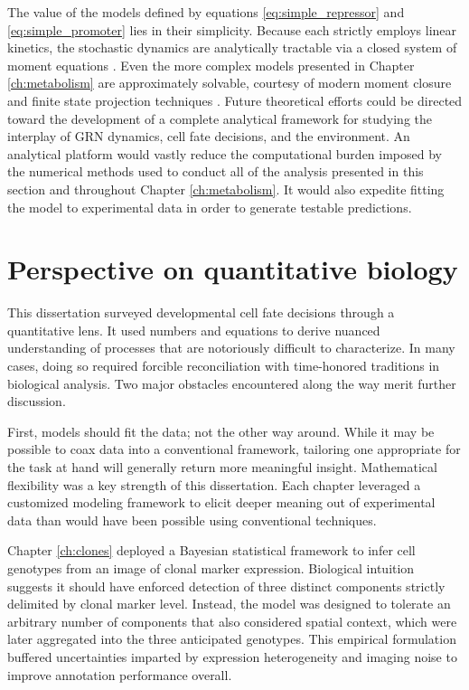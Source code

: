 The value of the models defined by equations \ref{eq:simple_repressor} and \ref{eq:simple_promoter} lies in their simplicity. Because each strictly employs linear kinetics, the stochastic dynamics are analytically tractable via a closed system of moment equations \cite{Sotiropoulos2011}. Even the more complex models presented in Chapter \ref{ch:metabolism} are approximately solvable, courtesy of modern moment closure and finite state projection techniques \cite{Singh2011,Munsky2006}. Future theoretical efforts could be directed toward the development of a complete analytical framework for studying the interplay of GRN dynamics, cell fate decisions, and the environment. An analytical platform would vastly reduce the computational burden imposed by the numerical methods used to conduct all of the analysis presented in this section and throughout Chapter \ref{ch:metabolism}. It would also expedite fitting the model to experimental data in order to generate testable predictions. 

\section{Perspective on quantitative biology}

This dissertation surveyed developmental cell fate decisions through a quantitative lens. It used numbers and equations to derive nuanced understanding of processes that are notoriously difficult to characterize. In many cases, doing so required forcible reconciliation with time-honored traditions in biological analysis. Two major obstacles encountered along the way merit further discussion.

First, models should fit the data; not the other way around. While it may be possible to coax data into a conventional framework, tailoring one appropriate for the task at hand will generally return more meaningful insight. Mathematical flexibility was a key strength of this dissertation. Each chapter leveraged a customized modeling framework to elicit deeper meaning out of experimental data than would have been possible using conventional techniques. 

Chapter \ref{ch:clones} deployed a Bayesian statistical framework to infer cell genotypes from an image of clonal marker expression. Biological intuition suggests it should have enforced detection of three distinct components strictly delimited by clonal marker level. Instead, the model was designed to tolerate an arbitrary number of components that also considered spatial context, which were later aggregated into the three anticipated genotypes. This empirical formulation buffered uncertainties imparted by expression heterogeneity and imaging noise to improve annotation performance overall.

